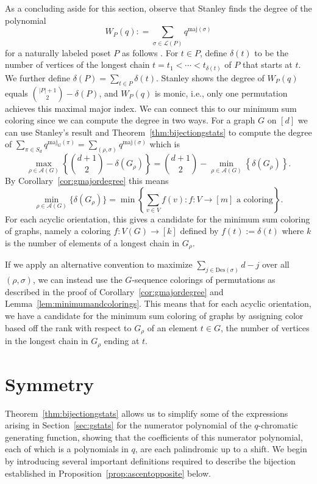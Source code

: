 \documentclass[11pt]{amsart}
\newcommand{\maj}{\mathrm{maj}}
\newcommand{\des}{\mathrm{Des}}
\newcommand{\acyclic}[1]{\mathcal{A}(#1)}
\newcommand{\jhset}[1]{\mathcal{L}(#1)}
\begin{document}
As a concluding aside for this section, observe that Stanley finds the degree of the polynomial
    \[
        W_P(q) : = \sum_{\sigma \in \jhset{P}} q^{\maj(\sigma)}
    \]
    for a naturally labeled poset $P$ as follows \cite[Section~3.15]{enumerativecombinatorics}.
    For $t \in P$, define $\delta(t)$ to be the number of vertices of the longest chain $t = t_1 < \cdots < t_{\delta(t)}$ of $P$ that starts at $t$. 
    We further define $\delta(P) = \sum_{t \in P} \delta(t)$.
    Stanley shows the degree of $W_P(q)$ equals $\binom{|P|+1}{2} - \delta(P)$, and $W_P(q)$ is monic, i.e., only one permutation achieves this maximal major index.
    We can connect this to our minimum sum coloring since we can compute the degree in two ways.
    For a graph $G$ on $[d]$ we can use Stanley's result and Theorem~\ref{thm:bijectiongstats} to compute the degree of $\sum_{\pi \in S_d} q^{\maj_G(\pi)} = \sum_{(\rho,\sigma)} q^{\maj(\sigma)}$ which is 
    \[
        \max_{\rho \in \acyclic{G}}\left\{ \binom{d+1}{2} - \delta(G_\rho) \right\} = \binom{d+1}{2} -
\min_{\rho \in \acyclic{G}} \left\{\delta(G_\rho) \right\}.
    \]
    By Corollary~\ref{cor:gmajordegree} this means
    \[
        \min_{\rho \in \acyclic{G}} \{\delta(G_\rho)\} = \min\left\{ \sum_{v \in V} f(v): f:V \to [m] \text{ a coloring} \right\}.
    \]
    For each acyclic orientation, this gives a candidate for the minimum sum coloring of graphs, namely a coloring $f:V(G) \to [k]$ defined by $f(t):=\delta(t)$ where $k$ is the number of elements of a longest chain in $G_\rho$.
    
    If we apply an alternative convention to maximize $\sum_{j \in \des(\sigma)} d-j$ over all $(\rho,\sigma)$, we can instead use the $G$-sequence colorings of permutations as described in the proof of Corollary~\ref{cor:gmajordegree} and Lemma~\ref{lem:minimumandcolorings}.
    This means that for each acyclic orientation, we have a candidate for the minimum sum coloring of graphs by assigning color based off the rank with respect to $G_\rho$ of an element $t \in G$, the number of vertices in the longest chain in $G_\rho$ ending at $t$.



\section{Symmetry}\label{sec:symmetry}

Theorem~\ref{thm:bijectiongstats} allows us to simplify some of the expressions arising in Section~\ref{sec:gstats} for the numerator polynomial of the $q$-chromatic generating function, showing that the coefficients of this numerator polynomial, each of which is a polynomials in $q$, are each palindromic up to a shift. 
We begin by introducing several important definitions required to describe the bijection established in Proposition~\ref{prop:ascentopposite} below.
\end{document}
